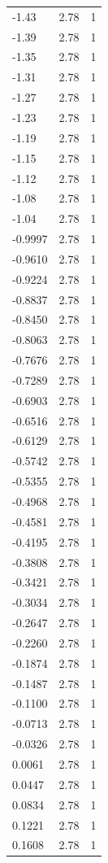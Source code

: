 \begin{longtable}{lrr}
  -1.43 & 2.78 & 1 \\
  -1.39 & 2.78 & 1 \\
  -1.35 & 2.78 & 1 \\
  -1.31 & 2.78 & 1 \\
  -1.27 & 2.78 & 1 \\
  -1.23 & 2.78 & 1 \\
  -1.19 & 2.78 & 1 \\
  -1.15 & 2.78 & 1 \\
  -1.12 & 2.78 & 1 \\
  -1.08 & 2.78 & 1 \\
  -1.04 & 2.78 & 1 \\
  -0.9997 & 2.78 & 1 \\
  -0.9610 & 2.78 & 1 \\
  -0.9224 & 2.78 & 1 \\
  -0.8837 & 2.78 & 1 \\
  -0.8450 & 2.78 & 1 \\
  -0.8063 & 2.78 & 1 \\
  -0.7676 & 2.78 & 1 \\
  -0.7289 & 2.78 & 1 \\
  -0.6903 & 2.78 & 1 \\
  -0.6516 & 2.78 & 1 \\
  -0.6129 & 2.78 & 1 \\
  -0.5742 & 2.78 & 1 \\
  -0.5355 & 2.78 & 1 \\
  -0.4968 & 2.78 & 1 \\
  -0.4581 & 2.78 & 1 \\
  -0.4195 & 2.78 & 1 \\
  -0.3808 & 2.78 & 1 \\
  -0.3421 & 2.78 & 1 \\
  -0.3034 & 2.78 & 1 \\
  -0.2647 & 2.78 & 1 \\
  -0.2260 & 2.78 & 1 \\
  -0.1874 & 2.78 & 1 \\
  -0.1487 & 2.78 & 1 \\
  -0.1100 & 2.78 & 1 \\
  -0.0713 & 2.78 & 1 \\
  -0.0326 & 2.78 & 1 \\
  0.0061 & 2.78 & 1 \\
  0.0447 & 2.78 & 1 \\
  0.0834 & 2.78 & 1 \\
  0.1221 & 2.78 & 1 \\
  0.1608 & 2.78 & 1 \\

\end{longtable}
